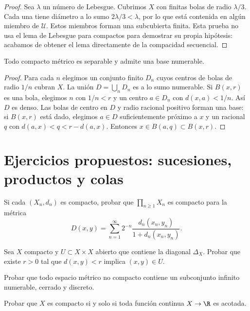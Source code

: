 \begin{proof}
Sea $\lambda$ un número de Lebesgue. Cubrimos $X$ con finitas bolas de radio $\lambda/3$. Cada una tiene diámetro a lo sumo $2\lambda/3<\lambda$, por lo que está contenida en algún miembro de $\mathcal U$. Estos miembros forman una subcubierta finita. Esta prueba no usa el lema de Lebesgue para compactos para demostrar su propia hipótesis: acabamos de obtener el lema directamente de la compacidad secuencial.
\end{proof}

\begin{corolario}\label{ch14:separable}
Todo compacto métrico es separable y admite una base numerable.
\end{corolario}
\begin{proof}
Para cada $n$ elegimos un conjunto finito $D_n$ cuyos centros de bolas de radio $1/n$ cubran $X$. La unión $D=\bigcup_nD_n$ es a lo sumo numerable. Si $B(x,r)$ es una bola, elegimos $n$ con $1/n<r$ y un centro $a\in D_n$ con $d(x,a)<1/n$. Así $D$ es denso. Las bolas de centro en $D$ y radio racional positivo forman una base: si $B(x,r)$ está dado, elegimos $a\in D$ suficientemente próximo a $x$ y un racional $q$ con $d(a,x)<q<r-d(a,x)$. Entonces $x\in B(a,q)\subset B(x,r)$.
\end{proof}

\section{Ejercicios propuestos: sucesiones, productos y colas}
\begin{ejercicio}\label{ej:lectura-14-1}
Si cada $(X_n,d_n)$ es compacto, probar que $\prod_{n\ge1}X_n$ es compacto para la métrica
\[
D(x,y)=\sum_{n=1}^\infty 2^{-n}\frac{d_n(x_n,y_n)}{1+d_n(x_n,y_n)}.
\]
\end{ejercicio}


\begin{ejercicio}\label{ej:lectura-14-2}
Sea $X$ compacto y $U\subset X\times X$ abierto que contiene la diagonal $\Delta_X$. Probar que existe $r>0$ tal que $d(x,y)<r$ implica $(x,y)\in U$.
\end{ejercicio}


\begin{ejercicio}\label{ej:lectura-14-3}
Probar que todo espacio métrico no compacto contiene un subconjunto infinito numerable, cerrado y discreto.
\end{ejercicio}


\begin{ejercicio}\label{ej:lectura-14-4}
Probar que $X$ es compacto si y solo si toda función continua $X\to\R$ es acotada.
\end{ejercicio}



